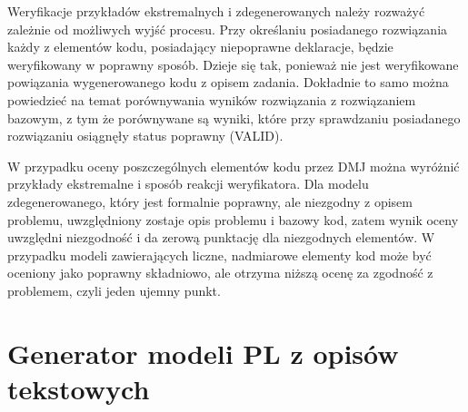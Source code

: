 Weryfikacje przykładów ekstremalnych i zdegenerowanych należy rozważyć zależnie od możliwych wyjść procesu. Przy określaniu posiadanego rozwiązania każdy z elementów kodu, posiadający niepoprawne deklaracje, będzie weryfikowany w poprawny sposób. Dzieje się tak, ponieważ nie jest weryfikowane powiązania wygenerowanego kodu z opisem zadania. Dokładnie to samo można powiedzieć na temat porównywania wyników rozwiązania z rozwiązaniem bazowym, z tym że porównywane są wyniki, które przy sprawdzaniu posiadanego rozwiązaniu osiągnęły status poprawny (VALID).

W przypadku oceny poszczególnych elementów kodu przez DMJ można wyróżnić przykłady ekstremalne i sposób reakcji weryfikatora. Dla modelu zdegenerowanego, który jest formalnie poprawny, ale niezgodny z opisem problemu, uwzględniony zostaje opis problemu i bazowy kod, zatem wynik oceny uwzględni niezgodność i da zerową punktację dla niezgodnych elementów. W przypadku modeli zawierających liczne, nadmiarowe elementy kod może być oceniony jako poprawny składniowo, ale otrzyma niższą ocenę za zgodność z problemem, czyli jeden ujemny punkt.

\section{Generator modeli PL z opisów tekstowych}






